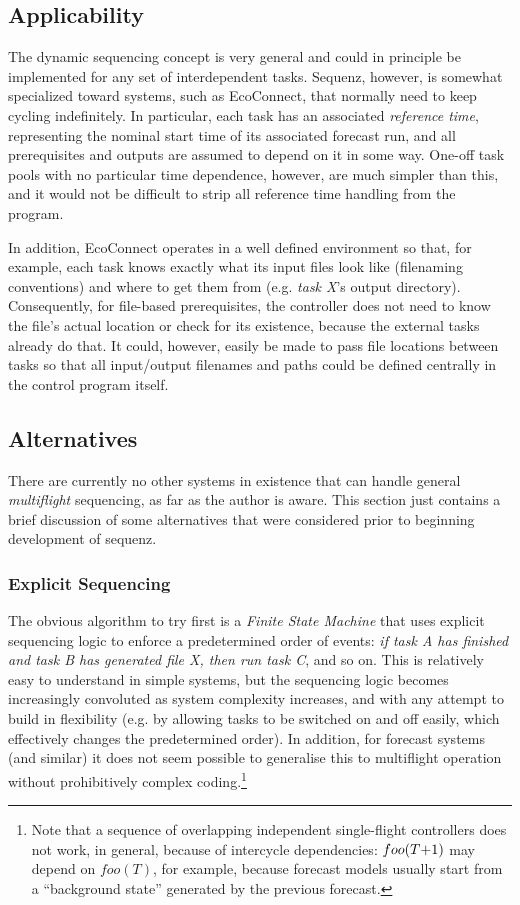 \documentclass[11pt,a4paper]{article}
\begin{document}
\subsection{Applicability}

The dynamic sequencing concept is very general and could in principle be
implemented for any set of interdependent tasks. Sequenz, however, is
somewhat specialized toward systems, such as EcoConnect, that normally
need to keep cycling indefinitely. In particular, each task has an
associated {\em reference time}, representing the nominal start time of
its associated forecast run, and all prerequisites and outputs are
assumed to depend on it in some way.  One-off task pools with no
particular time dependence, however, are much simpler than this, and it
would not be difficult to strip all reference time handling from the
program.

In addition, EcoConnect operates in a well defined environment so that,
for example, each task knows exactly what its input files look like
(filenaming conventions) and where to get them from (e.g. {\em task X}'s
output directory). Consequently, for file-based prerequisites, the
controller does not need to know the file's actual location or check for
its existence, because the external tasks already do that. It could,
however, easily be made to pass file locations between tasks so that all
input/output filenames and paths could be defined centrally in the
control program itself.  


\subsection{Alternatives}

There are currently no other systems in existence that can handle
general {\em multiflight} sequencing, as far as the author is aware.
This section just contains a brief discussion of some alternatives that
were considered prior to beginning development of sequenz.

\subsubsection{Explicit Sequencing}

The obvious algorithm to try first is a {\em Finite State Machine} that
uses explicit sequencing logic to enforce a predetermined order of
events: {\em if task A has finished and task B has generated file X,
then run task C}, and so on. This is relatively easy to understand in
simple systems, but the sequencing logic becomes increasingly convoluted
as system complexity increases, and with any attempt to build in
flexibility (e.g. by allowing tasks to be switched on and off easily,
which effectively changes the predetermined order). In addition, for
forecast systems (and similar) it does not seem possible to generalise
this to multiflight operation without prohibitively complex
coding.\footnote{Note that a sequence of overlapping independent
single-flight controllers does not work, in general, because of
intercycle dependencies: $foo(T\negmedspace +\negmedspace 1)$ may depend
on $foo(T)$, for example, because forecast models usually start from a
``background state'' generated by the previous forecast.} 
\end{document}
